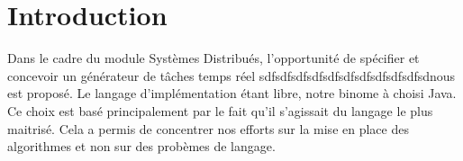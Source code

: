 \chapter{Introduction}
Dans le cadre du module Systèmes Distribués, l'opportunité de  spécifier et concevoir  un générateur de tâches temps réel sdfsdfsdfsdfsdfsdfsdfsdfsdfsdfsdnous est proposé. Le langage d'implémentation étant libre, notre binome à choisi Java. Ce choix est basé principalement par le fait qu'il s'agissait du langage le plus maitrisé. Cela a permis de concentrer nos efforts sur la mise en place des algorithmes et non sur des probèmes de langage.
